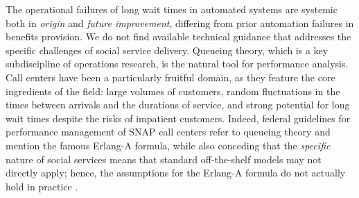 \documentclass[manuscript,screen,authorversion]{acmart}
\begin{document}


The operational failures of long wait times in automated systems are systemic both in \textit{origin} and \textit{future improvement}, differing from prior automation failures in benefits provision. We do not find available technical guidance that addresses the specific challenges of social service delivery. %
Queueing theory, which is a key subdiscipline of operations research, is the natural tool for performance analysis. Call centers have been a particularly fruitful domain, as they feature the core ingredients of the field: large volumes of customers, random fluctuations in the times between arrivals and the durations of service, and strong potential for long wait times despite the risks of impatient customers. 
Indeed, federal guidelines for performance management of SNAP call centers refer to queueing theory and mention the famous Erlang-A formula, while also conceding that the \textit{specific} nature of social services means that standard off-the-shelf models may not directly apply; hence, the assumptions for the Erlang-A formula do not actually hold in practice \citep{fns}. 
\end{document}
